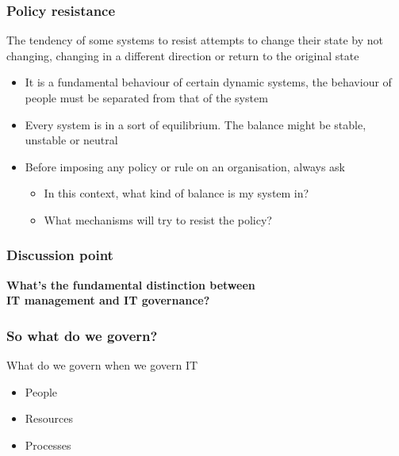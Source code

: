 \begin{frame}[fragile]
  \frametitle{Policy resistance}
  The tendency of some systems to resist attempts to change their state by not changing, changing in a different direction or return to the original state
	\begin{itemize}
		\item It is a fundamental behaviour of certain dynamic systems, the behaviour of people must be separated from that of the system
		\item Every system is in a sort of equilibrium. The balance might be stable, unstable or neutral
		\item Before imposing any policy or rule on an organisation, always ask
		\begin{itemize}
			\item In this context, what kind of balance is my system in?
			\item What mechanisms will try to resist the policy?
	\end{itemize}

	\end{itemize}
\end{frame}

\begin{frame}[fragile]
  \frametitle{Discussion point}
		\begin{center}
			\textbf{What's the fundamental distinction between \\IT management and IT governance?}
		\end{center}
\end{frame}

\begin{frame}[fragile]
  \frametitle{So what do we govern?}
	What do we govern when we govern IT
	\begin{itemize}
		\item People
		\item Resources
		\item Processes
	\end{itemize}
\end{frame}



